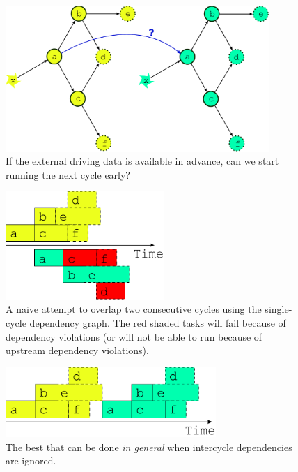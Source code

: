 \documentclass[11pt,a4paper]{article}
\begin{document}
\begin{figure}
    \begin{center}
        \includegraphics[width=10cm]{inkscape-svg/dep-two-cycles-linked} 
    \end{center}
    \caption[What if the external data is available early?]{\small If
    the external driving data is available in advance, can we start
    running the next cycle early?} 
    \label{fig-dep-two-linked}
\end{figure}

\begin{figure}
    \begin{center}
        \includegraphics[width=6cm]{inkscape-svg/timeline-one-c} 
    \end{center}
    \caption[Attempted overlap of consective single-cycle job
    schedules]{\small A naive attempt to overlap two consecutive cycles
    using the single-cycle dependency graph. The red shaded tasks will
    fail because of dependency violations (or will not be able to run
    because of upstream dependency violations).} 
    \label{fig-overlap}
\end{figure} 

\begin{figure}
    \begin{center}
        \includegraphics[width=8cm]{inkscape-svg/timeline-one-a} 
    \end{center}
    \caption[The only safe multicycle job schedule?]{\small The best that
    can be done {\em in general} when intercycle dependencies are
    ignored.} 
    \label{fig-job-no-overlap}
\end{figure} 
\end{document}
